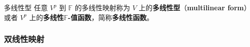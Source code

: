 \begin{definition}{多线性型}\label{def_MulMap_2}
任意 $V^p$ 到 $\mathbb{F}$ 的多线性映射称为 $V$ 上的\textbf{多线性型}（\textbf{multilinear form}）或者 $V^p$ 上的\textbf{多线性$\mathbb{F}$-值函数}，简称\textbf{多线性函数}。
\end{definition}


% 

\subsubsection{双线性映射}



